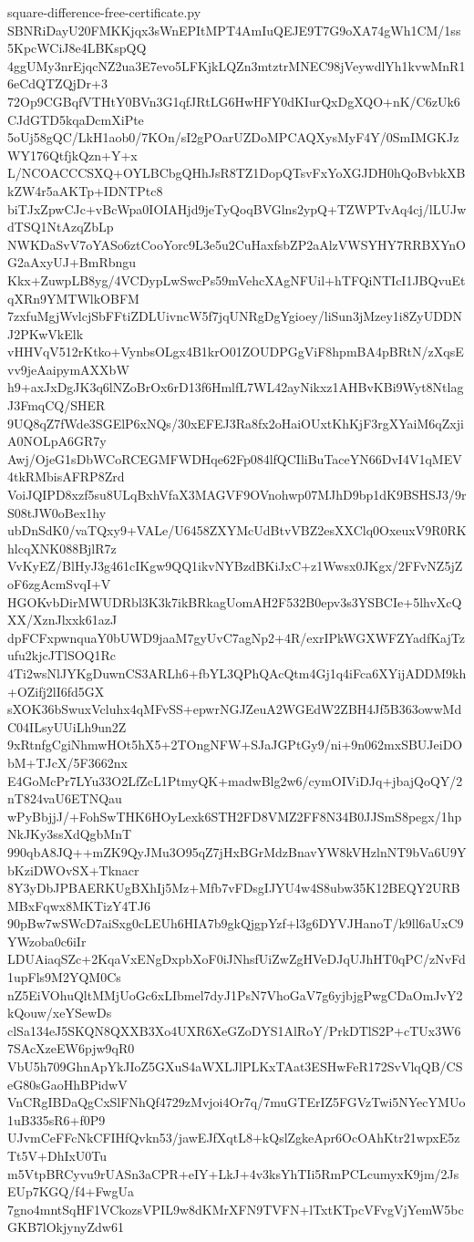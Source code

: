 \documentclass[11pt]{article}
\theoremstyle{definition}
\theoremstyle{remark}
\begin{document}
\begin{filecontents*}[overwrite]{square-difference-free-certificate.py}
SBNRiDayU20FMKKjqx3sWnEPItMPT4AmIuQEJE9T7G9oXA74gWh1CM/1ss5KpcWCiJ8e4LBKspQQ
4ggUMy3nrEjqcNZ2ua3E7evo5LFKjkLQZn3mtztrMNEC98jVeywdlYh1kvwMnR16eCdQTZQjDr+3
72Op9CGBqfVTHtY0BVn3G1qfJRtLG6HwHFY0dKIurQxDgXQO+nK/C6zUk6CJdGTD5kqaDcmXiPte
5oUj58gQC/LkH1aob0/7KOn/sI2gPOarUZDoMPCAQXysMyF4Y/0SmIMGKJzWY176QtfjkQzn+Y+x
L/NCOACCCSXQ+OYLBCbgQHhJsR8TZ1DopQTsvFxYoXGJDH0hQoBvbkXBkZW4r5aAKTp+IDNTPtc8
biTJxZpwCJc+vBcWpa0IOIAHjd9jeTyQoqBVGlns2ypQ+TZWPTvAq4cj/lLUJwdTSQ1NtAzqZbLp
NWKDaSvV7oYASo6ztCooYorc9L3e5u2CuHaxfsbZP2aAlzVWSYHY7RRBXYnOG2aAxyUJ+BmRbngu
Kkx+ZuwpLB8yg/4VCDypLwSwcPs59mVehcXAgNFUil+hTFQiNTIcI1JBQvuEtqXRn9YMTWlkOBFM
7zxfuMgjWvlcjSbFFtiZDLUivncW5f7jqUNRgDgYgioey/liSun3jMzey1i8ZyUDDNJ2PKwVkElk
vHHVqV512rKtko+VynbsOLgx4B1krO01ZOUDPGgViF8hpmBA4pBRtN/zXqsEvv9jeAaipymAXXbW
h9+axJxDgJK3q6lNZoBrOx6rD13f6HmlfL7WL42ayNikxz1AHBvKBi9Wyt8NtlagJ3FmqCQ/SHER
9UQ8qZ7fWde3SGElP6xNQs/30xEFEJ3Ra8fx2oHaiOUxtKhKjF3rgXYaiM6qZxjiA0NOLpA6GR7y
Awj/OjeG1sDbWCoRCEGMFWDHqe62Fp084lfQCIliBuTaceYN66DvI4V1qMEV4tkRMbisAFRP8Zrd
VoiJQIPD8xzf5su8ULqBxhVfaX3MAGVF9OVnohwp07MJhD9bp1dK9BSHSJ3/9rS08tJW0oBex1hy
ubDnSdK0/vaTQxy9+VALe/U6458ZXYMcUdBtvVBZ2esXXClq0OxeuxV9R0RKhlcqXNK088BjlR7z
VvKyEZ/BlHyJ3g461cIKgw9QQ1ikvNYBzdBKiJxC+z1Wwsx0JKgx/2FFvNZ5jZoF6zgAcmSvqI+V
HGOKvbDirMWUDRbl3K3k7ikBRkagUomAH2F532B0epv3s3YSBCIe+5lhvXcQXX/XznJlxxk61azJ
dpFCFxpwnquaY0bUWD9jaaM7gyUvC7agNp2+4R/exrIPkWGXWFZYadfKajTzufu2kjcJTlSOQ1Rc
4Ti2wsNlJYKgDuwnCS3ARLh6+fbYL3QPhQAcQtm4Gj1q4iFca6XYijADDM9kh+OZifj2lI6fd5GX
sXOK36bSwuxVcluhx4qMFvSS+epwrNGJZeuA2WGEdW2ZBH4Jf5B363owwMdC04ILsyUUiLh9un2Z
9xRtnfgCgiNhmwHOt5hX5+2TOngNFW+SJaJGPtGy9/ni+9n062mxSBUJeiDObM+TJcX/5F3662nx
E4GoMcPr7LYu33O2LfZcL1PtmyQK+madwBlg2w6/cymOIViDJq+jbajQoQY/2nT824vaU6ETNQau
wPyBbjjJ/+FohSwTHK6HOyLexk6STH2FD8VMZ2FF8N34B0JJSmS8pegx/1hpNkJKy3ssXdQgbMnT
990qbA8JQ++mZK9QyJMu3O95qZ7jHxBGrMdzBnavYW8kVHzlnNT9bVa6U9YbKziDWOvSX+Tknacr
8Y3yDbJPBAERKUgBXhIj5Mz+Mfb7vFDsgIJYU4w4S8ubw35K12BEQY2URBMBxFqwx8MKTizY4TJ6
90pBw7wSWcD7aiSxg0cLEUh6HIA7b9gkQjgpYzf+l3g6DYVJHanoT/k9ll6aUxC9YWzoba0c6iIr
LDUAiaqSZc+2KqaVxENgDxpbXoF0iJNhsfUiZwZgHVeDJqUJhHT0qPC/zNvFd1upFls9M2YQM0Cs
nZ5EiVOhuQltMMjUoGc6xLIbmel7dyJ1PsN7VhoGaV7g6yjbjgPwgCDaOmJvY2kQouw/xeYSewDs
clSa134eJ5SKQN8QXXB3Xo4UXR6XeGZoDYS1AlRoY/PrkDTlS2P+cTUx3W67SAcXzeEW6pjw9qR0
VbU5h709GhnApYkJIoZ5GXuS4aWXLJlPLKxTAat3ESHwFeR172SvVlqQB/CSeG80sGaoHhBPidwV
VnCRgIBDaQgCxSlFNhQf4729zMvjoi4Or7q/7muGTErIZ5FGVzTwi5NYecYMUo1uB335sR6+f0P9
UJvmCeFFcNkCFIHfQvkn53/jawEJfXqtL8+kQslZgkeApr6OcOAhKtr21wpxE5zTt5V+DhIxU0Tu
m5VtpBRCyvu9rUASn3aCPR+eIY+LkJ+4v3ksYhTIi5RmPCLcumyxK9jm/2JsEUp7KGQ/f4+FwgUa
7gno4mntSqHF1VCkozsVPIL9w8dKMrXFN9TVFN+lTxtKTpcVFvgVjYemW5bcGKB7lOkjynyZdw61

\end{filecontents*}
\end{document}
